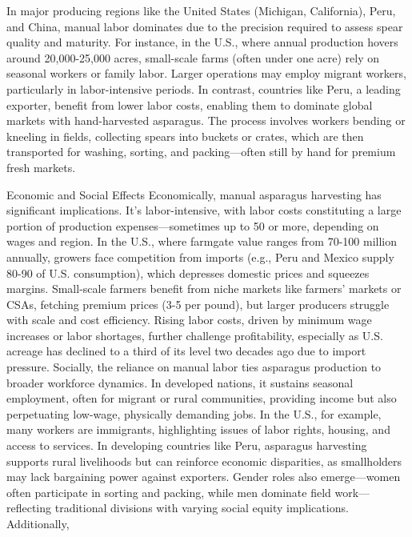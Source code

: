 In major producing regions like the United States (Michigan, California), Peru, and China, manual labor dominates due to the precision required to assess spear quality and maturity. For instance, in the U.S., where annual production hovers around 20,000-25,000 acres, small-scale farms (often under one acre) rely on seasonal workers or family labor. Larger operations may employ migrant workers, particularly in labor-intensive periods. In contrast, countries like Peru, a leading exporter, benefit from lower labor costs, enabling them to dominate global markets with hand-harvested asparagus. The process involves workers bending or kneeling in fields, collecting spears into buckets or crates, which are then transported for washing, sorting, and packing—often still by hand for premium fresh markets.


Economic and Social Effects
Economically, manual asparagus harvesting has significant implications. It’s labor-intensive, with labor costs constituting a large portion of production expenses—sometimes up to 50 or more, depending on wages and region. In the U.S., where farmgate value ranges from 70-100 million annually, growers face competition from imports (e.g., Peru and Mexico supply 80-90 of U.S. consumption), which depresses domestic prices and squeezes margins. Small-scale farmers benefit from niche markets like farmers' markets or CSAs, fetching premium prices (3-5 per pound), but larger producers struggle with scale and cost efficiency. Rising labor costs, driven by minimum wage increases or labor shortages, further challenge profitability, especially as U.S. acreage has declined to a third of its level two decades ago due to import pressure.
Socially, the reliance on manual labor ties asparagus production to broader workforce dynamics. In developed nations, it sustains seasonal employment, often for migrant or rural communities, providing income but also perpetuating low-wage, physically demanding jobs. In the U.S., for example, many workers are immigrants, highlighting issues of labor rights, housing, and access to services. In developing countries like Peru, asparagus harvesting supports rural livelihoods but can reinforce economic disparities, as smallholders may lack bargaining power against exporters. Gender roles also emerge—women often participate in sorting and packing, while men dominate field work—reflecting traditional divisions with varying social equity implications. Additionally, 

